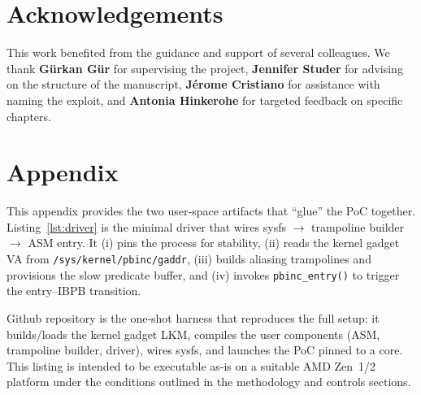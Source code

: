 \documentclass[11pt,a4paper]{article}
\begin{document}
\section*{Acknowledgements}
This work benefited from the guidance and support of several colleagues. We thank \textbf{G\"urkan G\"ur} for supervising the project, \textbf{Jennifer Studer} for advising on the structure of the manuscript, \textbf{J\'erome Cristiano} for assistance with naming the exploit, and \textbf{Antonia Hinkerohe} for targeted feedback on specific chapters.



\section{Appendix}
This appendix provides the two user‑space artifacts that “glue” the PoC together. 
Listing~\ref{lst:driver} is the minimal driver that wires sysfs $\rightarrow$ 
trampoline builder $\rightarrow$ ASM entry. It (i) pins the process for stability, 
(ii) reads the kernel gadget VA from \texttt{/sys/kernel/pbinc/gaddr}, 
(iii) builds aliasing trampolines and provisions the slow predicate buffer, and 
(iv) invokes \texttt{pbinc\_entry()} to trigger the entry–IBPB transition.

Github repository \cite{spectroscopic} is the one‑shot harness that reproduces the full setup: 
it builds/loads the kernel gadget LKM, compiles the user components (ASM, trampoline 
builder, driver), wires sysfs, and launches the PoC pinned to a core. This listing is 
intended to be executable as‑is on a suitable AMD Zen~1/2 platform under the conditions 
outlined in the methodology and controls sections.
\end{document}
